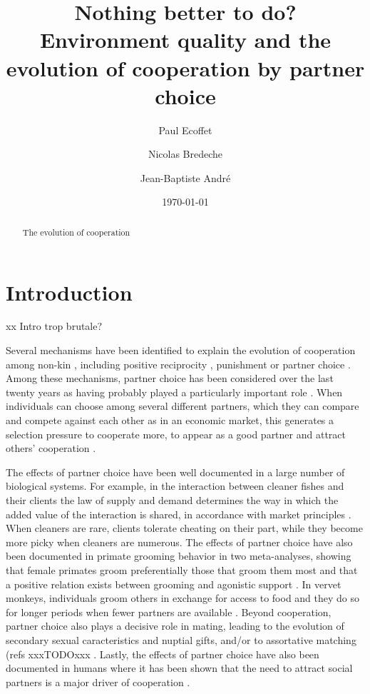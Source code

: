 \documentclass[twocolumn]{article}
\title{Nothing better to do? Environment quality and the evolution of cooperation by partner choice}
\author[1]{Paul Ecoffet}
\author[1,*]{Nicolas Bredeche}
\author[2,*]{Jean-Baptiste André}
\affil[1]{Institut des Systèmes Intelligents et Robotique, Sorbonne Université, Paris}
\affil[2]{Institut Jean-Nicod, École Normale Supérieure, Paris}
\affil[*]{\small{Equal contribution}}
\date{\today}
\begin{document}
\maketitle

\begin{abstract}
    The evolution of cooperation
\end{abstract}

\section{Introduction}

xx Intro trop brutale?

Several mechanisms have been identified to explain the evolution of cooperation among non-kin \citep{Trivers1971, MaynardSmith1974, Axelrod1981}, including positive reciprocity \cite{Trivers1971, Axelrod1981, Andre2007}, punishment \cite{Bshary2005, Raihani2012} or partner choice \cite{Eshel1982, Bull1991, West2007, Schino2017}. Among these mechanisms, partner choice has been considered over the last twenty years as having probably played a particularly important role \cite{Baumard2013a, +ref}. When individuals can choose among several different partners, which they can compare and compete against each other as in an economic market, this generates a selection pressure to cooperate more, to appear as a good partner and attract others' cooperation \cite{Noe1994}.

The effects of partner choice have been well documented in a large number of biological systems. For example, in the interaction between cleaner fishes and their clients the law of supply and demand determines the way in which the added value of the interaction is shared, in accordance with market principles \cite{Bshary2006}. When cleaners are rare, clients tolerate cheating on their part, while they become more picky when cleaners are numerous. The effects of partner choice have also been documented in primate grooming behavior in two meta-analyses, showing that female primates groom preferentially those that groom them most and that a positive relation exists between grooming and agonistic support \citep{Schino2007, Schino2008}. In vervet monkeys, individuals groom others in exchange for access to food and they do so for longer periods when fewer partners are available \cite{Fruteau2009}. Beyond cooperation, partner choice also plays a decisive role in mating, leading to the evolution of secondary sexual caracteristics and nuptial gifts, and/or to assortative matching (refs xxxTODOxxx \cite{Zahavi1975, xxTerrain}. Lastly, the effects of partner choice have also been documented in humans where it has been shown that the need to attract social partners is a major driver of cooperation \citep{Barclay2007a, Barclay2015, Barclay2016, Debove2015b,  Andre2011, Baumard2013a}.
\end{document}
